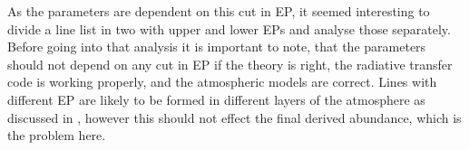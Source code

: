 As the parameters are dependent on this cut in EP, it
seemed interesting to divide a line list in two with upper and lower EPs and analyse those
separately. Before going into that analysis it is important to note, that the parameters should not
depend on any cut in EP if the theory is right, the radiative transfer code is working properly, and
the atmospheric models are correct. Lines with different EP are likely to be formed in different
layers of the atmosphere as discussed in , however this should not
effect the final derived abundance, which is the problem here.
